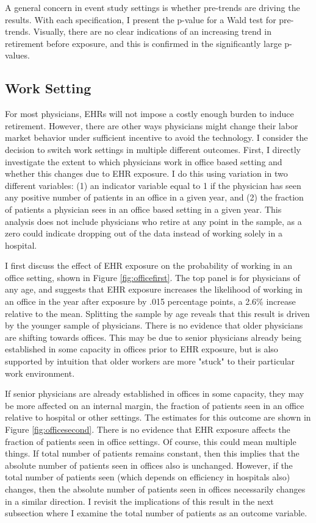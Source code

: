 \documentclass[11pt]{article}
\begin{document}
A general concern in event study settings is whether pre-trends are driving the results. With each specification, I present the p-value for a Wald test for pre-trends. Visually, there are no clear indications of an increasing trend in retirement before exposure, and this is confirmed in the significantly large p-values.


\subsection{Work Setting}

For most physicians, EHRs will not impose a costly enough burden to induce retirement. However, there are other ways physicians might change their labor market behavior under sufficient incentive to avoid the technology. I consider the decision to switch work settings in multiple different outcomes. First, I directly investigate the extent to which physicians work in office based setting and whether this changes due to EHR exposure. I do this using variation in two different variables: (1) an indicator variable equal to 1 if the physician has seen any positive number of patients in an office in a given year, and (2) the fraction of patients a physician sees in an office based setting in a given year. This analysis does not include physicians who retire at any point in the sample, as a zero could indicate dropping out of the data instead of working solely in a hospital. 

I first discuss the effect of EHR exposure on the probability of working in an office setting, shown in Figure \ref{fig:officefirst}. The top panel is for physicians of any age, and suggests that EHR exposure increases the likelihood of working in an office in the year after exposure by .015 percentage points, a 2.6\% increase relative to the mean. Splitting the sample by age reveals that this result is driven by the younger sample of physicians. There is no evidence that older physicians are shifting towards offices. This may be due to senior physicians already being established in some capacity in offices prior to EHR exposure, but is also supported by intuition that older workers are more "stuck" to their particular work environment. 

If senior physicians are already established in offices in some capacity, they may be more affected on an internal margin, the fraction of patients seen in an office relative to hospital or other settings. The estimates for this outcome are shown in Figure \ref{fig:officesecond}. There is no evidence that EHR exposure affects the fraction of patients seen in office settings. Of course, this could mean multiple things. If total number of patients remains constant, then this implies that the absolute number of patients seen in offices also is unchanged. However, if the total number of patients seen (which depends on efficiency in hospitals also) changes, then the absolute number of patients seen in offices necessarily changes in a similar direction. I revisit the implications of this result in the next subsection where I examine the total number of patients as an outcome variable.
\end{document}
